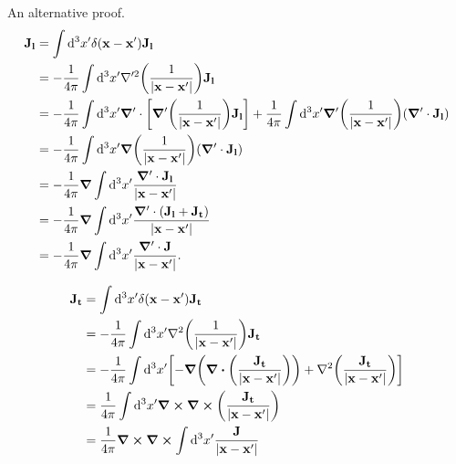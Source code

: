 \documentclass[10pt]{article}
\begin{document}
An alternative proof.
\begin{align*}
	\vb{J_l} &= \int \dd^3{x'} \delta(\vb{x} -\vb{x'}) \vb{J_l} \\
	&= - \frac{1}{4\pi} \int \dd^3{x'} \nabla'^2\qty(\frac{1}{\abs{\vb{x}-\vb{x'}}}) \vb{J_l} \\
	&= - \frac{1}{4\pi} \int \dd^3{x'} \grad' \cdot \qty[\grad'\qty(\frac{1}{\abs{\vb{x}-\vb{x'}}}) \vb{J_l}] + \frac{1}{4\pi} \int \dd^3{x'} \grad'\qty(\frac{1}{\abs{\vb{x}-\vb{x'}}}) (\grad' \cdot \vb{J_l}) \\
	&= - \frac{1}{4\pi} \int \dd^3{x'} \grad \qty(\frac{1}{\abs{\vb{x}-\vb{x'}}}) (\grad' \cdot \vb{J_l}) \\
	&= - \frac{1}{4\pi} \grad \int \dd^3{x'} \frac{\grad' \cdot \vb{J_l}}{\abs{\vb{x}-\vb{x'}}} \\
	&= - \frac{1}{4\pi} \grad \int \dd^3{x'} \frac{\grad' \cdot (\vb{J_l} + \vb{J_t})}{\abs{\vb{x}-\vb{x'}}} \\
	&= - \frac{1}{4\pi} \grad \int \dd^3{x'} \frac{\grad' \cdot \vb{J}}{\abs{\vb{x}-\vb{x'}}}.
\end{align*}

\begin{align*}
	\vb{J_t} &= \int \dd^3{x'} \delta(\vb{x} -\vb{x'}) \vb{J_t} \\
	&= - \frac{1}{4\pi} \int \dd^3{x'} \nabla^2\qty(\frac{1}{\abs{\vb{x}-\vb{x'}}}) \vb{J_t} \\
	&= - \frac{1}{4\pi} \int \dd^3{x'} \qty[- \grad(\div(\frac{\vb{J_t}}{\abs{\vb{x}-\vb{x'}}})) + \laplacian(\frac{\vb{J_t}}{\abs{\vb{x}-\vb{x'}}})] \\
	&= \frac{1}{4\pi} \int \dd^3{x'} \curl \curl(\frac{\vb{J_t}}{\abs{\vb{x}-\vb{x'}}}) \\
	&= \frac{1}{4\pi} \curl \curl \int \dd^3{x'} \frac{\vb{J}}{\abs{\vb{x}-\vb{x'}}}
\end{align*}
\end{document}
